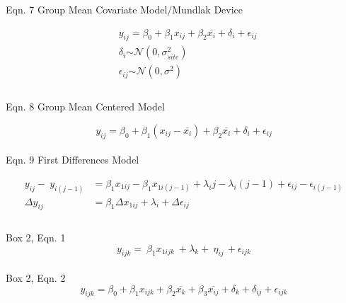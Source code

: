 \documentclass{article}
\begin{document}
Eqn. 7 Group Mean Covariate Model/Mundlak Device

\begin{equation}
  \begin{split}
& y_{ij} = \beta_{0} + \beta_{1} x_{ij} + \beta_{2}\overline{x_{i}} + \delta_{i} + \epsilon_{ij} \\
& \delta_{i} \mathcal{\sim N} \left( 0,\sigma_{site}^{2} \right) \\
& \epsilon_{ij}\mathcal{\sim N}\left( 0,\sigma^{2} \right) \\  
  \end{split}
\end{equation}\\

Eqn. 8 Group Mean Centered Model

\begin{equation}
y_{ij} = \beta_{0} + \beta_{1}\left( x_{ij} - \overline{x_{i}} \right) + \beta_{2}\overline{x_{i}} + \delta_{i} + \epsilon_{ij}
\end{equation}\\

Eqn. 9 First Differences Model

\begin{equation}
  \begin{split}
y_{ij}  - \ y_{i(j - 1)} &= \beta_{1}x_{1ij} - \beta_{1} x_{1i(j - 1)} + \lambda_{i}j - \lambda_{i}(j - 1) + \epsilon_{ij} - \epsilon_{i(j - 1)} \\
\Delta y_{ij} &= \beta_{1} \Delta x_{1ij} + \lambda_{i} + \Delta \epsilon_{ij} \\ 
  \end{split}
\end{equation}\\

Box 2, Eqn. 1
\[y_{ijk} = {\ \beta}_{1}x_{1ijk}\  + \lambda_{k} + \ \eta_{ij\ } + \epsilon_{ijk}\]\\


Box 2, Eqn. 2
\[y_{ijk} = \beta_{0} + \beta_{1}x_{ijk} + \beta_{2}\overline{x_{k}} + \beta_{3}\overline{x_{ij}} + \delta_{k} + \delta_{ij} + \epsilon_{ijk}\]\\
\end{document}
